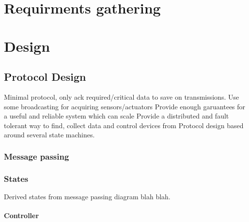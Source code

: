 \documentclass{l4proj}
\begin{document}

\chapter{Requirments gathering} %
\label{cha:requirments_gathering}






\chapter{Design} %
\label{cha:design}


\section{Protocol Design} %
\label{sec:protocol_design}
Minimal protocol, only ack required/critical data to save on transmissions.
Use some broadcasting for acquiring sensors/actuators
Provide enough garuantees for a useful and reliable system which can scale
Provide a distributed and fault tolerant way to find, collect data and control devices from
Protocol design based around several state machines. 

\subsection{Message passing} %
\label{sub:message_passing}

\subsection{States} %
\label{sub:states}
Derived states from message passing diagram blah blah.

\subsubsection{Controller} %
\label{ssub:controller}
\end{document}
